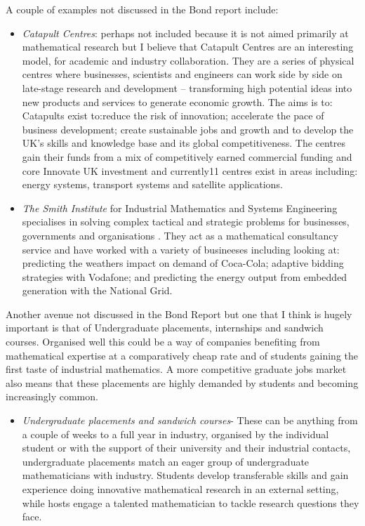 \documentclass[11pt]{article} %
\begin{document}
A couple of examples not discussed in the Bond report include:
\begin{itemize}
	\item \textit{Catapult Centres}: perhaps not included because it is not aimed primarily at mathematical research but I believe that Catapult Centres are an interesting model, for academic and industry collaboration. They are a series of physical centres where  businesses, scientists and engineers can work side by side on late-stage research and development – transforming high potential ideas into new products and services to generate economic growth.  The aims is to:  Catapults exist to:reduce the risk of innovation; 	accelerate the pace of business development;  create sustainable jobs and growth and to	develop the UK’s skills and knowledge base and its global competitiveness. The centres gain their funds from a mix of competitively earned commercial funding and core Innovate UK investment and currently11 centres exist in areas including: energy systems, transport systems and satellite applications. 
	\item \textit{The Smith Institute} for Industrial Mathematics and Systems Engineering specialises in solving complex tactical and strategic problems for businesses, governments and organisations \cite{Smith}. They act as a mathematical consultancy service and have worked with a variety of busineeses including looking at:  predicting the weathers impact on demand of Coca-Cola; adaptive bidding strategies with Vodafone; and predicting the energy output from embedded generation with the National Grid. 
\end{itemize}
Another avenue not discussed in the Bond Report but one that I think is hugely important is that of Undergraduate placements, internships and sandwich courses. Organised well this could be a way of companies benefiting from mathematical expertise at a comparatively cheap rate and of students gaining the first taste of industrial mathematics. A more competitive graduate jobs market also means that these placements are highly demanded by students and becoming increasingly common. 
\begin{itemize}
	\item \textit{Undergraduate placements and sandwich courses}- These can be anything from a couple of weeks to a full year in industry, organised by the individual student or with the support of their university and their industrial contacts, undergraduate placements match an eager group of undergraduate mathematicians with industry. Students develop transferable skills and gain experience doing innovative mathematical research in an external setting, while hosts engage a talented mathematician to tackle research questions they face.
\end{itemize}
\end{document}
